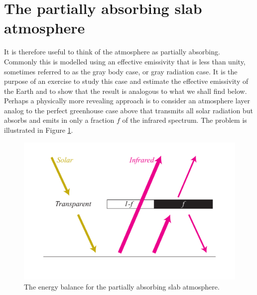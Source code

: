 \documentclass[12pt]{book}
\begin{document}
\section{The partially absorbing slab atmosphere}
\label{sec:partially_absorbing_slab}
It is therefore useful to think of the atmosphere as partially absorbing. Commonly this is modelled using an effective emissivity that is less than unity, sometimes referred to as the gray body case, or gray radiation case. 
It is the purpose of an exercise to study this case and estimate the effective emissivity of the Earth and to show that the result is analogous to what we shall find below. 
Perhaps a physically more revealing approach is to consider an atmosphere layer analog to the perfect greenhouse case above that transmits all solar radiation but absorbs and emits in only a fraction $f$ of the infrared spectrum. The problem is illustrated in Figure \ref{fig:partially_absorbing_atmosphere}.

\begin{figure}
\begin{center}
\includegraphics[width=12 cm]{../illustrations/Partially_absorbing_atmosphere}
\end{center}
\caption{ The energy balance for the partially absorbing slab atmosphere.    } 
\label{fig:partially_absorbing_atmosphere}
\end{figure}
\end{document}
